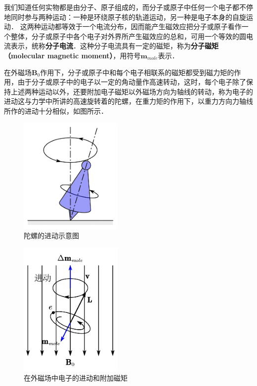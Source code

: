 
我们知道任何实物都是由分子、原子组成的，而分子或原子中任何一个电子都不停地同时参与两种运动：一种是环绕原子核的轨道运动，另一种是电子本身的自旋运动． 这两种运动都等效于一个电流分布，因而能产生磁效应把分子或原子看作一个整体，分子或原子中各个电子对外界所产生磁效应的总和，可用一个等效的圆电流表示，统称\textbf{分子电流}．这种分子电流具有一定的磁矩，称为\textbf{分子磁矩（molecular magnetic moment）}，用符号$\mathbf m_{mole}$表示．

在外磁场$\mathbf B_0$作用下，分子或原子中和每个电子相联系的磁矩都受到磁力矩的作用，由于分子或原子中的电子以一定的角动量作高速转动，这时，每个电子除了保持上述两种运动以外，还要附加电子磁矩以外磁场方向为轴线的转动，称为电子的进动这与力学中所讲的高速旋转着的陀螺，在重力矩的作用下，以重力方向力轴线所作的进动十分相似，如图所示．
\begin{figure}[ht]
\centering
\includegraphics[width=5cm]{./figures/MoMaMo_1.pdf}
\caption{陀螺的进动示意图} \label{MoMaMo_fig1}
\end{figure}
\begin{figure}[ht]
\centering
\includegraphics[width=5cm]{./figures/MoMaMo_2.pdf}
\caption{在外磁场中电子的进动和附加磁矩} \label{MoMaMo_fig2}
\end{figure}
